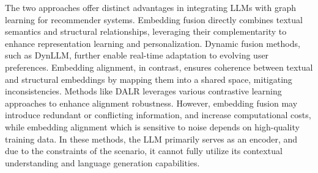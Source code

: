 The two approaches offer distinct advantages in integrating LLMs with graph learning for recommender systems. Embedding fusion directly combines textual semantics and structural relationships, leveraging their complementarity to enhance representation learning and personalization. Dynamic fusion methods, such as DynLLM, further enable real-time adaptation to evolving user preferences. Embedding alignment, in contrast, ensures coherence between textual and structural embeddings by mapping them into a shared space, mitigating inconsistencies. Methods like DALR leverages various contrastive learning approaches to enhance alignment robustness. However, embedding fusion may introduce redundant or conflicting information, and increase computational costs, while embedding alignment which is sensitive to noise depends on high-quality training data.
In these methods, the LLM primarily serves as an encoder, and due to the constraints of the scenario, it cannot fully utilize its contextual understanding and language generation capabilities.
